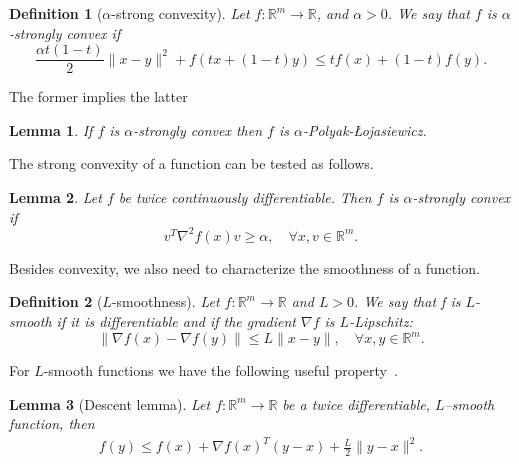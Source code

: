 \documentclass[
    aps,
    prx,
    floatfix,
    nofootinbib,
    onecolumn
]{revtex4-2}
\newtheorem{definition}{Definition}
\newtheorem{lemma}{Lemma}
\begin{document}
\begin{definition}[$\alpha$-strong convexity]
Let $f : \mathbb{R}^m \rightarrow \mathbb{R}$, and $\alpha > 0$. We say that $f$ is $\alpha$-strongly convex if
\begin{equation}
    \frac{ \alpha t(1-t) } {2} \| x - y \| ^2 
+ f(tx + (1-t)y) \leq tf (x) + (1-t)f(y).
\end{equation} 
\end{definition}

The former implies the latter

\begin{lemma}
\label{lem:PL}
If $f$ is $\alpha$-strongly convex then $f$ is $\alpha$-Polyak-{\L}ojasiewicz.
\end{lemma}

The strong convexity of a function can be tested as follows.

\begin{lemma}
\label{lem:strong_convexity}
Let $f$ be twice continuously differentiable. Then $f$ is $\alpha$-strongly convex if 
\begin{equation}
    v^T \nabla^2 f(x) v \geq \alpha, \quad \forall x,v \in \mathbb{R}^m .
\end{equation}
\end{lemma}

Besides convexity, we also need to characterize the smoothness of a function.

\begin{definition}[$L$-smoothness]
\label{def:smooth}
Let $f:\mathbb{R}^m \rightarrow \mathbb{R}$ and $L > 0$. We say that f is $L$-smooth if it is differentiable
and if the gradient $\nabla f$ is $L$-Lipschitz:
\begin{equation}
\| \nabla f(x) - \nabla f(y) \| \leq L \| x - y \|, \quad \forall x, y \in \mathbb{R}^m.
\end{equation}
\end{definition}

For $L$-smooth functions we have the following useful property~\cite{Garrigos2023}.

\begin{lemma}[Descent lemma]
\label{lem:descent}
Let $f: \mathbb{R}^m \rightarrow \mathbb{R}$ be a twice differentiable, $L$–smooth function, then
\begin{align}
f(y) \leq f(x) + \nabla f(x)^T (y-x) + \frac{L}{2} \| y -x \|^2 .
\end{align}
\end{lemma}
\end{document}
